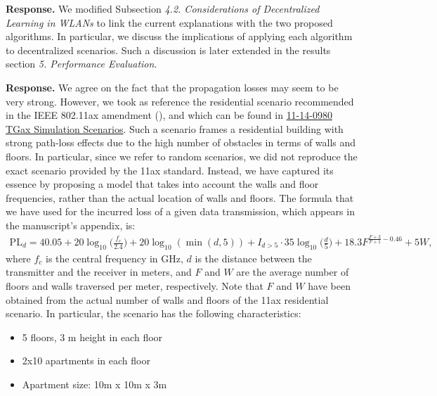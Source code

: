 \documentclass[a4paper,twoside,11pt]{reviewresponse}
\begin{document}
	
	\textbf{Response.} We modified Subsection \textit{4.2. Considerations of Decentralized Learning in WLANs} to link the current explanations with the two proposed algorithms. In particular, we discuss the implications of applying each algorithm to decentralized scenarios. Such a discussion is later extended in the results section \textit{5. Performance Evaluation}.
	
	
	\textbf{Response.} We agree on the fact that the propagation losses may seem to be very strong. However, we took as reference the residential scenario recommended in the IEEE 802.11ax amendment (\cite{merlin2015tgax}), and which can be found in \href{https://mentor.ieee.org/802.11/dcn/14/11-14-0980-16-00ax-simulation-scenarios.docx}{11-14-0980 TGax Simulation Scenarios}. Such a scenario frames a residential building with strong path-loss effects due to the high number of obstacles in terms of walls and floors. In particular, since we refer to random scenarios, we did not reproduce the exact scenario provided by the 11ax standard. Instead, we have captured its essence by proposing a model that takes into account the walls and floor frequencies, rather than the actual location of walls and floors. The formula that we have used for the incurred loss of a given data transmission, which appears in the manuscript's appendix, is:
	\begin{align}
	\text{PL}_d = 40.05 + 20 \log_{10}\Big(\frac{f_c}{2.4}\Big) + 20 \log_{10}(\min(d,5)) + \nonumber I_{d>5} \cdot 35\log_{10}\Big(\frac{d}{5}\Big) + 18.3 F^{\frac{F+2}{F+1}-0.46} + 5W,
	\nonumber
    \end{align}
    where $f_c$ is the central frequency in GHz, $d$ is the distance between the transmitter and the receiver in meters, and $F$ and $W$ are the average number of floors and walls traversed per meter, respectively. Note that $F$ and $W$ have been obtained from the actual number of walls and floors of the 11ax residential scenario. In particular, the scenario has the following characteristics:
    \begin{itemize}
        \item 5 floors, 3 m height in each floor
        \item 2x10 apartments in each floor
        \item Apartment size: 10m x 10m x 3m
    \end{itemize}
    
\end{document}
